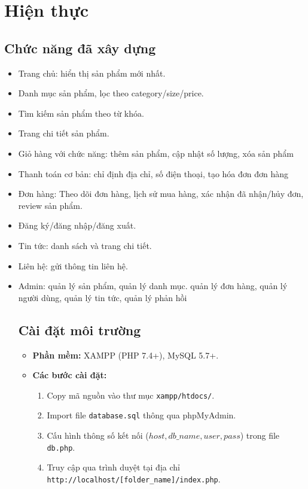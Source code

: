 \section{Hiện thực}
\subsection{Chức năng đã xây dựng}
\begin{itemize}
    \item Trang chủ: hiển thị sản phẩm mới nhất.
\item Danh mục sản phẩm, lọc theo category/size/price.
\item Tìm kiếm sản phẩm theo từ khóa.
\item Trang chi tiết sản phẩm.
\item Giỏ hàng với chức năng: thêm sản phẩm, cập nhật số lượng, xóa sản phẩm
\item Thanh toán cơ bản: chỉ định địa chỉ, số điện thoại, tạo hóa đơn đơn hàng
\item Đơn hàng: Theo dõi đơn hàng, lịch sử mua hàng, xác nhận đã nhận/hủy đơn, review sản phẩm.
\item Đăng ký/đăng nhập/đăng xuất.
\item Tin tức: danh sách và trang chi tiết.
\item Liên hệ: gửi thông tin liên hệ.
\item Admin: quản lý sản phẩm, quản lý danh mục. quản lý đơn hàng, quản lý người dùng, quản lý tin tức, quản lý phản hồi

\subsection{Cài đặt môi trường}
\begin{itemize}
    \item \textbf{Phần mềm:} XAMPP (PHP 7.4+), MySQL 5.7+.
    \item \textbf{Các bước cài đặt:}
    \begin{enumerate}
        \item Copy mã nguồn vào thư mục \texttt{xampp/htdocs/}.
        \item Import file \texttt{database.sql} thông qua phpMyAdmin.
        \item Cấu hình thông số kết nối ($host, db\_name, user, pass$) trong file \texttt{db.php}.
        \item Truy cập qua trình duyệt tại địa chỉ\\ \texttt{http://localhost/[folder\_name]/index.php}.
    \end{enumerate}
\end{itemize}



\end{itemize}
